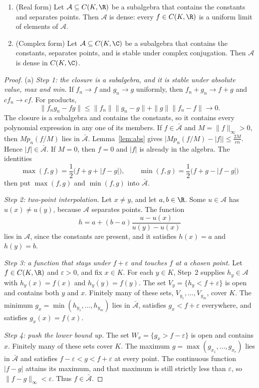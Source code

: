 \begin{theorem}\label{thm:sw}
\begin{enumerate}[label=(\alph*)]
\item (Real form) Let $\mathcal A\subseteq C(K,\R)$ be a subalgebra that contains the constants and separates points. Then $\mathcal A$ is dense: every $f\in C(K,\R)$ is a uniform limit of elements of $\mathcal A$.
\item (Complex form) Let $\mathcal A\subseteq C(K,\C)$ be a subalgebra that contains the constants, separates points, and is stable under complex conjugation. Then $\mathcal A$ is dense in $C(K,\C)$.
\end{enumerate}
\end{theorem}
\begin{proof}
(a) \emph{Step 1: the closure is a subalgebra, and it is stable under absolute value, max and min.} If $f_n\to f$ and $g_n\to g$ uniformly, then $f_n+g_n\to f+g$ and $cf_n\to cf$. For products,
\[\|f_ng_n-fg\|\le\|f_n\|\|g_n-g\|+\|g\|\|f_n-f\|\to0.\]
The closure is a subalgebra and contains the constants, so it contains every polynomial expression in any one of its members. If $f\in\bar{\mathcal A}$ and $M=\|f\|_\infty>0$, then $Mp_n(f/M)$ lies in $\bar{\mathcal A}$. Lemma~\ref{lem:abs} gives $\bigl|Mp_n(f/M)-|f|\bigr|\le\frac{2M}{en}$. Hence $|f|\in\bar{\mathcal A}$. If $M=0$, then $f=0$ and $|f|$ is already in the algebra. The identities
\[\max(f,g)=\frac12\bigl(f+g+|f-g|\bigr),\qquad\min(f,g)=\frac12\bigl(f+g-|f-g|\bigr)\]
then put $\max(f,g)$ and $\min(f,g)$ into $\bar{\mathcal A}$.

\emph{Step 2: two-point interpolation.} Let $x\ne y$, and let $a,b\in\R$. Some $u\in\mathcal A$ has $u(x)\ne u(y)$, because $\mathcal A$ separates points. The function
\[h=a+(b-a)\frac{u-u(x)}{u(y)-u(x)}\]
lies in $\mathcal A$, since the constants are present, and it satisfies $h(x)=a$ and $h(y)=b$.

\emph{Step 3: a function that stays under $f+\varepsilon$ and touches $f$ at a chosen point.} Let $f\in C(K,\R)$ and $\varepsilon>0$, and fix $x\in K$. For each $y\in K$, Step~2 supplies $h_y\in\mathcal A$ with $h_y(x)=f(x)$ and $h_y(y)=f(y)$. The set $V_y=\{h_y<f+\varepsilon\}$ is open and contains both $y$ and $x$. Finitely many of these sets, $V_{y_1},\dots,V_{y_m}$, cover $K$. The minimum $g_x=\min(h_{y_1},\dots,h_{y_m})$ lies in $\bar{\mathcal A}$, satisfies $g_x<f+\varepsilon$ everywhere, and satisfies $g_x(x)=f(x)$.

\emph{Step 4: push the lower bound up.} The set $W_x=\{g_x>f-\varepsilon\}$ is open and contains $x$. Finitely many of these sets cover $K$. The maximum $g=\max(g_{x_1},\dots,g_{x_r})$ lies in $\bar{\mathcal A}$ and satisfies $f-\varepsilon<g<f+\varepsilon$ at every point. The continuous function $|f-g|$ attains its maximum, and that maximum is still strictly less than $\varepsilon$, so $\|f-g\|_\infty<\varepsilon$. Thus $f\in\bar{\mathcal A}$.


\end{proof}
